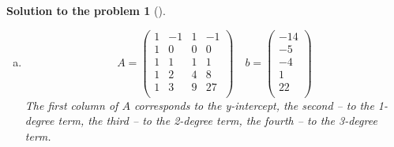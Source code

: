 \documentclass[12pt,a4]{article}
\newtheorem{solution}{Solution to the problem}
\begin{document}
\begin{solution}[]
\begin{enumerate}[(a)]
\[\begin{pmatrix}
\end{pmatrix}
\]
The first column of $A$ corresponds to the y-intercept, the second -- to the 1-degree term, the third -- to the 2-degree term.
\[
A^\top A = 
\begin{pmatrix}
 4 &   16 &   74 \\
16 &   74 &  376 \\
74 &  376 & 2018 \\
\end{pmatrix} \qquad
(A^\top A)^{-1} = \frac{1}{90}
\begin{pmatrix}
 1989 & -1116 & 135 \\ 
-1116 &   649 & -80 \\ 
  135 &   -80 &  10 \\
\end{pmatrix}
\]
\[
(A^\top A)^{-1} A^\top =  \frac{1}{90}
\begin{pmatrix}
 297 & -144 & -216 &  153 \\
-138 &  111 &  129 & -102 \\
  15 &  -15 &  -15 &   15 \\
\end{pmatrix}
\]
\[
x = (A^\top A)^{-1} A^\top b
= \frac{1}{90}
\begin{pmatrix} 
180 \\ 450 \\ -270
\end{pmatrix}
=
\begin{pmatrix} 
2 \\ 5 \\ -3
\end{pmatrix}
\]
So, the quadratic polynomial $y = 3x^2 + 5x + 2$ best fits the points.
\item
\[
A = 
\begin{pmatrix}
1 & -1 & 1 & -1\\
1 & 0 & 0 & 0\\
1 & 1 & 1 & 1\\
1 & 2 & 4 & 8\\
1 & 3 & 9 & 27\\
\end{pmatrix} \quad
b = 
\begin{pmatrix}
-14\\ -5\\ -4\\ 1\\ 22 \\
\end{pmatrix}
\]
The first column of $A$ corresponds to the y-intercept, the second -- to the 1-degree term, the third -- to the 2-degree term, the fourth -- to the 3-degree term.

\end{enumerate}
\end{solution}
\end{document}
